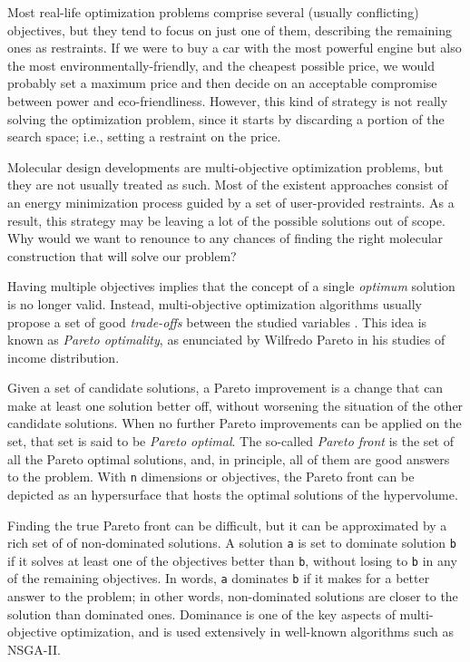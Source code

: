 Most real-life optimization problems comprise several (usually conflicting) objectives, but they tend to focus on just one of them, describing the remaining ones as restraints. If we were to buy a car with the most powerful engine but also the most environmentally-friendly, and the cheapest possible price, we would probably set a maximum price and then decide on an acceptable compromise between power and eco-friendliness. However, this kind of strategy is not really solving the optimization problem, since it starts by discarding a portion of the search space; i.e., setting a restraint on the price.

Molecular design developments are multi-objective optimization problems, but they are not usually treated as such. Most of the existent approaches consist of an energy minimization process guided by a set of user-provided restraints. As a result, this strategy may be leaving a lot of the possible solutions out of scope. Why would we want to renounce to any chances of finding the right molecular construction that will solve our problem?

Having multiple objectives implies that the concept of a single \emph{optimum} solution is no longer valid. Instead, multi-objective optimization algorithms usually propose a set of good \emph{trade-offs} between the studied variables \citep{Coello2001}. This idea is known as \emph{Pareto optimality}, as enunciated by Wilfredo Pareto in his studies of income distribution.

Given a set of candidate solutions, a Pareto improvement is a change that can make at least one solution better off, without worsening the situation of the other candidate solutions. When no further Pareto improvements can be applied on the set, that set is said to be \emph{Pareto optimal}. The so-called \emph{Pareto front} is the set of all the Pareto optimal solutions, and, in principle, all of them are good answers to the problem. With \texttt{n} dimensions or objectives, the Pareto front can be depicted as an hypersurface that hosts the optimal solutions of the hypervolume.

Finding the true Pareto front can be difficult, but it can be approximated by a rich set of of non-dominated solutions. A solution \texttt{a} is set to dominate solution \texttt{b} if it solves at least one of the objectives better than \texttt{b}, without losing to \texttt{b} in any of the remaining objectives. In words, \texttt{a} dominates \texttt{b} if it makes for a better answer to the problem; in other words, non-dominated solutions are closer to the solution than dominated ones. Dominance is one of the key aspects of multi-objective optimization, and is used extensively in well-known algorithms such as NSGA-II.

